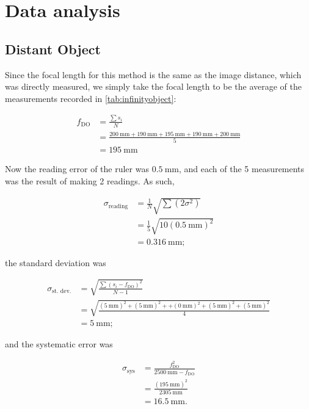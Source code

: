 \chapter{Data analysis}


\section{Distant Object}
Since the focal length for this method is the same as the image distance, which was directly measured, we simply take the focal length to be the average of the measurements recorded in \cref{tab:infinityobject}:

\begin{align*}
    f_\text{DO} &= \frac{\sum s_i}{N} \\
    &= \frac{\qty{200}{\milli\metre} + \qty{190}{\milli\metre} + \qty{195}{\milli\metre} + \qty{190}{\milli\metre} + \qty{200}{\milli\metre}}{5} \\
    &= \qty{195}{\milli\metre}
\end{align*}

Now the reading error of the ruler was $\qty{0.5}{\milli\metre}$, and each of the 5 measurements was the result of making 2 readings. As such,

\begin{align*}
    \sigma_\text{reading} &= \frac{1}{N} \sqrt{\sum (2\sigma^2)} \\
    &= \frac{1}{5} \sqrt{10(\qty{0.5}{\milli\metre})^2} \\
    &= \qty{0.316}{\milli\metre};
\end{align*}    

the standard deviation was

\begin{align*}
    \sigma_\text{st. dev.} &= \sqrt{\frac{\sum (s_i - f_\text{DO})^2}{N-1}} \\
    &= \sqrt{\frac{(\qty{5}{\milli\metre})^2 + (\qty{5}{\milli\metre})^2 + + (\qty{0}{\milli\metre})^2 + (\qty{5}{\milli\metre})^2 + (\qty{5}{\milli\metre})^2}{4}} \\
    &= \qty{5}{\milli\metre};
\end{align*}

and the systematic error was 

\begin{align*}
    \sigma_\text{sys} &= \frac{f_\text{DO}^2}{\qty{2500}{\milli\metre} - f_\text{DO}} \\
    &= \frac{(\qty{195}{\milli\metre})^2}{\qty{2305}{\milli\metre}} \\
    &= \qty{16.5}{\milli\metre}.
\end{align*}

